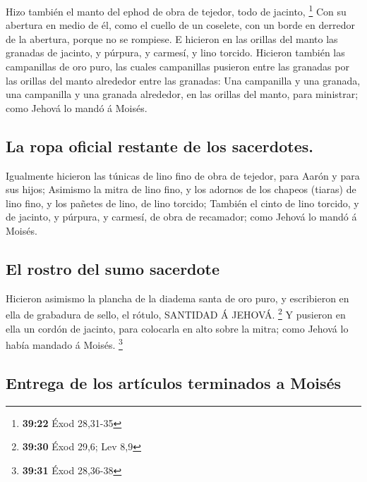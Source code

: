  Hizo también el manto del ephod de obra de tejedor, todo
de jacinto, \footnote{\textbf{39:22} Éxod 28,31-35}  Con
su abertura en medio de él, como el cuello de un coselete, con un borde
en derredor de la abertura, porque no se rompiese.  E
hicieron en las orillas del manto las granadas de jacinto, y púrpura, y
carmesí, y lino torcido.  Hicieron también las
campanillas de oro puro, las cuales campanillas pusieron entre las
granadas por las orillas del manto alrededor entre las granadas:
 Una campanilla y una granada, una campanilla y una
granada alrededor, en las orillas del manto, para ministrar; como Jehová
lo mandó á Moisés.

\hypertarget{la-ropa-oficial-restante-de-los-sacerdotes.}{%
\subsection{La ropa oficial restante de los
sacerdotes.}\label{la-ropa-oficial-restante-de-los-sacerdotes.}}

 Igualmente hicieron las túnicas de lino fino de obra de
tejedor, para Aarón y para sus hijos;  Asimismo la mitra
de lino fino, y los adornos de los chapeos (tiaras) de lino fino, y los
pañetes de lino, de lino torcido;  También el cinto de
lino torcido, y de jacinto, y púrpura, y carmesí, de obra de recamador;
como Jehová lo mandó á Moisés.

\hypertarget{el-rostro-del-sumo-sacerdote}{%
\subsection{El rostro del sumo
sacerdote}\label{el-rostro-del-sumo-sacerdote}}

 Hicieron asimismo la plancha de la diadema santa de oro
puro, y escribieron en ella de grabadura de sello, el rótulo, SANTIDAD Á
JEHOVÁ. \footnote{\textbf{39:30} Éxod 29,6; Lev 8,9}  Y
pusieron en ella un cordón de jacinto, para colocarla en alto sobre la
mitra; como Jehová lo había mandado á Moisés. \footnote{\textbf{39:31}
  Éxod 28,36-38}

\hypertarget{entrega-de-los-artuxedculos-terminados-a-moisuxe9s}{%
\subsection{Entrega de los artículos terminados a
Moisés}\label{entrega-de-los-artuxedculos-terminados-a-moisuxe9s}}

